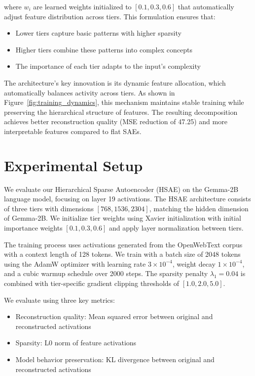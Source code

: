 \documentclass{article} %
\begin{document}
where $w_i$ are learned weights initialized to $[0.1, 0.3, 0.6]$ that automatically adjust feature distribution across tiers. This formulation ensures that:

\begin{itemize}
    \item Lower tiers capture basic patterns with higher sparsity
    \item Higher tiers combine these patterns into complex concepts
    \item The importance of each tier adapts to the input's complexity
\end{itemize}

The architecture's key innovation is its dynamic feature allocation, which automatically balances activity across tiers. As shown in Figure~\ref{fig:training_dynamics}, this mechanism maintains stable training while preserving the hierarchical structure of features. The resulting decomposition achieves better reconstruction quality (MSE reduction of 47.25) and more interpretable features compared to flat SAEs.

\section{Experimental Setup}
\label{sec:experimental}

We evaluate our Hierarchical Sparse Autoencoder (HSAE) on the Gemma-2B language model, focusing on layer 19 activations. The HSAE architecture consists of three tiers with dimensions $[768, 1536, 2304]$, matching the hidden dimension of Gemma-2B. We initialize tier weights using Xavier initialization with initial importance weights $[0.1, 0.3, 0.6]$ and apply layer normalization between tiers.

The training process uses activations generated from the OpenWebText corpus with a context length of 128 tokens. We train with a batch size of 2048 tokens using the AdamW optimizer with learning rate $3 \times 10^{-4}$, weight decay $1 \times 10^{-4}$, and a cubic warmup schedule over 2000 steps. The sparsity penalty $\lambda_1 = 0.04$ is combined with tier-specific gradient clipping thresholds of $[1.0, 2.0, 5.0]$.

We evaluate using three key metrics:
\begin{itemize}
    \item Reconstruction quality: Mean squared error between original and reconstructed activations
    \item Sparsity: L0 norm of feature activations
    \item Model behavior preservation: KL divergence between original and reconstructed activations
\end{itemize}
\end{document}
